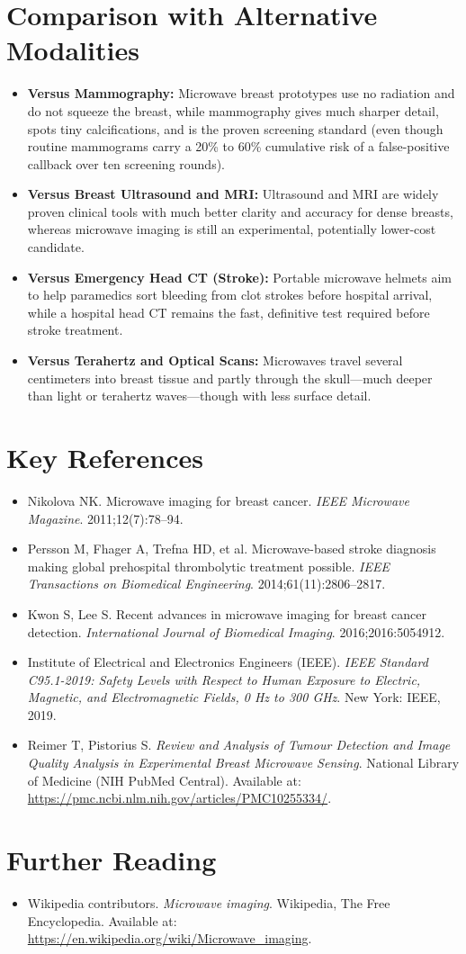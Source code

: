 \section{Comparison with Alternative Modalities}
\begin{itemize}
  \item \textbf{Versus Mammography:} Microwave breast prototypes use no radiation and do not squeeze the breast, while mammography gives much sharper detail, spots tiny calcifications, and is the proven screening standard (even though routine mammograms carry a 20\% to 60\% cumulative risk of a false-positive callback over ten screening rounds).
  \item \textbf{Versus Breast Ultrasound and MRI:} Ultrasound and MRI are widely proven clinical tools with much better clarity and accuracy for dense breasts, whereas microwave imaging is still an experimental, potentially lower-cost candidate.
  \item \textbf{Versus Emergency Head CT (Stroke):} Portable microwave helmets aim to help paramedics sort bleeding from clot strokes before hospital arrival, while a hospital head CT remains the fast, definitive test required before stroke treatment.
  \item \textbf{Versus Terahertz and Optical Scans:} Microwaves travel several centimeters into breast tissue and partly through the skull---much deeper than light or terahertz waves---though with less surface detail.
\end{itemize}

\section{Key References}
\begin{itemize}
  \item Nikolova NK. Microwave imaging for breast cancer. \textit{IEEE Microwave Magazine}. 2011;12(7):78--94.
  \item Persson M, Fhager A, Trefna HD, et al. Microwave-based stroke diagnosis making global prehospital thrombolytic treatment possible. \textit{IEEE Transactions on Biomedical Engineering}. 2014;61(11):2806--2817.
  \item Kwon S, Lee S. Recent advances in microwave imaging for breast cancer detection. \textit{International Journal of Biomedical Imaging}. 2016;2016:5054912.
  \item Institute of Electrical and Electronics Engineers (IEEE). \textit{IEEE Standard C95.1-2019: Safety Levels with Respect to Human Exposure to Electric, Magnetic, and Electromagnetic Fields, 0 Hz to 300 GHz}. New York: IEEE, 2019.
  \item Reimer T, Pistorius S. \textit{Review and Analysis of Tumour Detection and Image Quality Analysis in Experimental Breast Microwave Sensing}. National Library of Medicine (NIH PubMed Central). Available at: \url{https://pmc.ncbi.nlm.nih.gov/articles/PMC10255334/}.
\end{itemize}

\section{Further Reading}
\begin{itemize}
  \item Wikipedia contributors. \textit{Microwave imaging}. Wikipedia, The Free Encyclopedia. Available at: \url{https://en.wikipedia.org/wiki/Microwave_imaging}.
\end{itemize}
